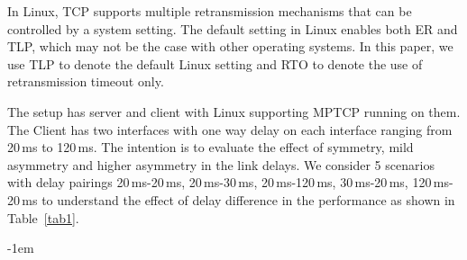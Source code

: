 \documentclass[10pt,conference,compsoc]{IEEEtran}
\begin{document}
In Linux, TCP supports multiple retransmission mechanisms that can be controlled by a system setting. The default setting in Linux enables both
ER and TLP, which may not be the case with other operating systems. In this paper, we use TLP to denote the default Linux setting and RTO to denote the use of retransmission timeout only.

The setup has server and client with Linux supporting MPTCP running on them. The Client has two interfaces with one way delay on each interface ranging from 20\,ms to 120\,ms. The intention is to evaluate the effect of symmetry, mild asymmetry and higher asymmetry in the link delays. We consider 5 scenarios with delay pairings 20\,ms-20\,ms, 20\,ms-30\,ms, 20\,ms-120\,ms, 30\,ms-20\,ms, 120\,ms-20\,ms to understand the effect of delay difference in the performance as shown in Table~\ref{tab1}.

\kern-1em
\end{document}
